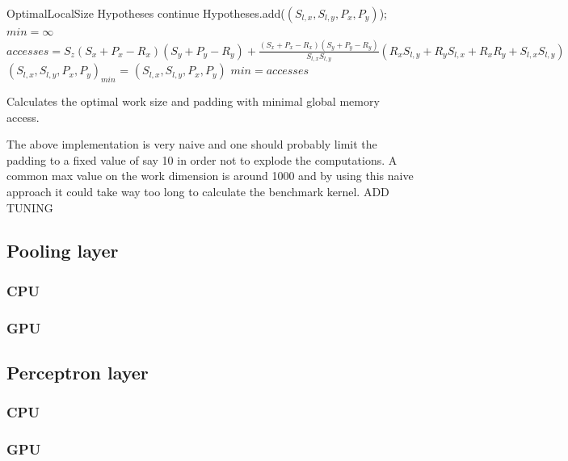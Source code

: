 \documentclass[a4paper,10pt]{article}
\theoremstyle{definition}
\begin{document}
\begin{algorithm}[H]
	\DontPrintSemicolon
	OptimalLocalSize\;
	Hypotheses \;
	{
		{
				{
					{
					{
						continue\;
					}
					\Else
					{
						Hypotheses.add($(S_{l,x}, S_{l,y}, P_x, P_y)$);
					}
				}
			}
		}
	}
	$min = \infty$ \;
	{
		$accesses = S_z(S_x + P_x - R_x)(S_y + P_y - R_y) +
		\frac{(S_x + P_x - R_x)(S_y + P_y - R_y)}{S_{l,x}S_{l,y}} ( R_xS_{l,y} + R_yS_{l,x} + R_xR_y + S_{l,x}S_{l,y})$ \;
		{
		$(S_{l,x}, S_{l,y}, P_x, P_y)_{min}$ = $(S_{l,x}, S_{l,y}, P_x, P_y)$ \;
			$min = accesses$
		}
	}
\caption{Calculates the optimal work size and padding with minimal global memory access.}
\end{algorithm}
The above implementation is very naive and one should probably limit the padding to a fixed value of say 10 in order not to explode the computations. A common max value on the work dimension is around 1000 and by using this naive approach it could take way too long to calculate the benchmark kernel.
\begingroup
\huge ADD TUNING
\endgroup 
\subsection{Pooling layer}
\subsubsection{CPU}
\subsubsection{GPU}
\subsection{Perceptron layer} 
\subsubsection{CPU}
\subsubsection{GPU}


\appendix
\end{document}
